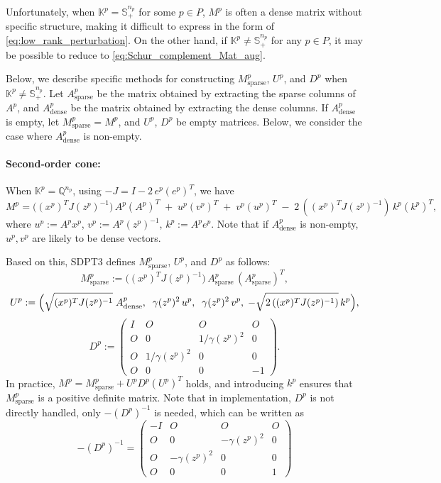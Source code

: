 \documentclass{scrartcl}
\begin{document}
\medskip

Unfortunately, when $\mathbb{K}^p = \mathbb{S}^{n_p}_+$ for some $p \in P$, $M^p$ is often a dense matrix without specific structure, making it difficult to express in the form of \eqref{eq:low_rank_perturbation}.
On the other hand, if $\mathbb{K}^p \neq \mathbb{S}^{n_p}_+$ for any $p\in P$, it may be possible to reduce to \eqref{eq:Schur_complement_Mat_aug}.

\medskip

Below, we describe specific methods for constructing $M^p_{\mathrm{sparse}}$, $U^p$, and $D^p$ when $\mathbb{K}^p \neq \mathbb{S}^{n_p}_+$.
Let $A^p_{\mathrm{sparse}}$ be the matrix obtained by extracting the sparse columns of $A^p$, and $A^p_{\mathrm{dense}}$ be the matrix obtained by extracting the dense columns.
If $A^p_{\mathrm{dense}}$ is empty, let $M^p_{\mathrm{sparse}} = M^p$, and $U^p$, $D^p$ be empty matrices.
Below, we consider the case where $A^p_{\mathrm{dense}}$ is non-empty.

\paragraph{Second-order cone:}

When $\mathbb{K}^p=\mathbb{Q}^{n_p}$, using $-J = I - 2\,e^p(e^p)^T$, we have
\[
  M^p 
  = \bigl((x^p)^T J (z^p)^{-1}\bigr)\, A^p(A^p)^T
    \;+\; u^p (v^p)^T
    \;+\; v^p (u^p)^T
    \;-\; 2\,((x^p)^T J (z^p)^{-1})\, k^p (k^p)^T,
\]
where $u^p := A^p x^p$, $v^p := A^p (z^p)^{-1}$, $k^p := A^p e^p$.
Note that if $A^p_{\mathrm{dense}}$ is non-empty, $u^p, v^p$ are likely to be dense vectors.

Based on this, SDPT3 defines $M^p_{\mathrm{sparse}}$, $U^p$, and $D^p$ as follows:
\[
  M^p_{\mathrm{sparse}}
    := \bigl((x^p)^T J (z^p)^{-1}\bigr)\,
       A^p_{\mathrm{sparse}}\,(A^p_{\mathrm{sparse}})^T,
\]
\[
  U^p
    := \Bigl(\sqrt{(x^p)^T J (z^p)^{-1}}\;A^p_{\mathrm{dense}},
       \;\;\gamma(z^p)^2\,u^p,\;\;\gamma(z^p)^2\,v^p,
       \;-\sqrt{2\,((x^p)^T J (z^p)^{-1})}\,k^p\Bigr),
\]
\[
  D^p
    := \begin{pmatrix}
         I & O & O & O \\
         O & 0 & 1/\gamma(z^p)^2 & 0 \\
         O & 1/\gamma(z^p)^2 & 0 & 0 \\
         O & 0 & 0 & -1
       \end{pmatrix}.
\]
In practice, $M^p = M^p_{\mathrm{sparse}} + U^p D^p (U^p)^T$ holds, and introducing $k^p$ ensures that $M^p_{\mathrm{sparse}}$ is a positive definite matrix.
Note that in implementation, $D^p$ is not directly handled, only $-(D^p)^{-1}$ is needed, which can be written as
\[
  -(D^p)^{-1}
  = \begin{pmatrix}
      -I & O & O & O \\
      O & 0 & -\gamma(z^p)^2 & 0 \\
      O & -\gamma(z^p)^2 & 0 & 0 \\
      O & 0 & 0 & 1
    \end{pmatrix}
\]
\end{document}
